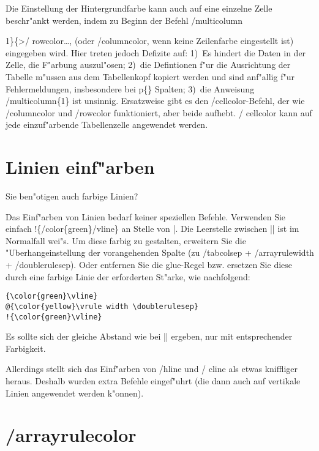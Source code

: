 \documentclass[ngerman]{article}
\begin{document}
Die Einstellung der Hintergrundfarbe kann auch auf eine einzelne Zelle beschr"ankt werden, 
indem zu Beginn der Befehl \slash \textsf{multicolumn}{1\}\{>\slash
\textsf{rowcolor}\ldots, (oder
\slash \textsf{columncolor}, wenn keine Zeilenfarbe eingestellt ist) eingegeben wird. Hier treten 
jedoch Defizite auf: 1)~Es hindert die Daten in der Zelle, die F"arbung
auszul"osen; 2)~die Defintionen f"ur die Ausrichtung der Tabelle m"ussen aus dem Tabellenkopf 
kopiert werden und sind anf"allig f"ur Fehlermeldungen, insbesondere bei
p\{\} Spalten; 3)~die Anweisung \slash \textsf{multicolumn}\{1\} ist unsinnig. Ersatzweise gibt es 
den \slash \textsf{cellcolor}-Befehl, der wie \slash \textsf{columncolor}
und \slash \textsf{rowcolor} funktioniert, aber beide aufhebt. \slash
\textsf{cellcolor} kann auf jede einzuf"arbende Tabellenzelle angewendet werden.

\section{Linien einf"arben}

Sie ben"otigen auch farbige Linien?

Das Einf"arben von Linien bedarf keiner speziellen Befehle. Verwenden Sie
einfach !\{\slash \textsf{color}\{green\}\slash \textsf{vline}\} an Stelle von |. Die Leerstelle 
zwischen || ist im Normalfall wei"s. Um diese farbig zu gestalten, erweitern Sie die 
"Uberhangeinstellung der vorangehenden Spalte (zu \slash \textsf{tabcolsep}
+ \slash \textsf{arrayrulewidth} + \slash \textsf{doublerulesep}). Oder entfernen Sie die glue-Regel 
bzw. ersetzen Sie diese durch eine farbige Linie der erforderten St"arke,
wie nachfolgend: 

\begin{verbatim}
{\color{green}\vline}
@{\color{yellow}\vrule width \doublerulesep}
!{\color{green}\vline}
\end{verbatim}

Es sollte sich der gleiche Abstand wie bei || ergeben, nur mit entsprechender Farbigkeit.

Allerdings stellt sich das Einf"arben von \slash \textsf{hline} und \slash
\textsf{cline} als etwas kniffliger heraus. Deshalb wurden extra Befehle eingef"uhrt (die dann auch 
auf vertikale Linien angewendet werden k"onnen).

\section{\slash \textsf{arrayrulecolor}}

}
\end{document}
